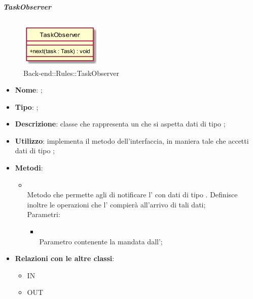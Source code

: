 \hypertarget{TaskObserver_label}{\subparagraph{TaskObserver}}
\begin{figure}[h]
	\centering
	\includegraphics[width=0.35\textwidth,height=\textheight,keepaspectratio]{images/ClassTaskObserver.png}
	\caption{Back-end::Rules::TaskObserver}
\end{figure}
\begin{itemize}
	\item \textbf{Nome}: ;
	\item \textbf{Tipo}: ;
	\item \textbf{Descrizione}: classe che rappresenta un  che si aspetta dati di tipo ;
	\item \textbf{Utilizzo}: implementa il metodo  dell'interfaccia, in maniera tale che accetti dati di tipo ;
	\item \textbf{Metodi}:
	\begin{itemize}
		\item[]  \\		Metodo che permette agli  di notificare l' con dati di tipo . Definisce inoltre le operazioni che l' compierà all'arrivo di tali dati;\\
		Parametri:
		\begin{itemize}
			\item {} \\
			Parametro contenente la  mandata dall';
		\end{itemize}
	\end{itemize}
	\item \textbf{Relazioni con le altre classi}:
	\begin{itemize}
		\item IN \hyperlink{TaskObservable_label}{}
		\item OUT \hyperlink{Task_label}{}
	\end{itemize}
\end{itemize}
\FloatBarrier

